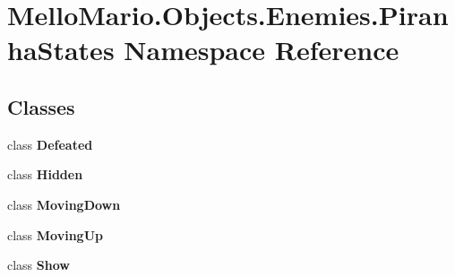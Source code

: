 \section{Mello\+Mario.\+Objects.\+Enemies.\+Piranha\+States Namespace Reference}
\label{namespaceMelloMario_1_1Objects_1_1Enemies_1_1PiranhaStates}
\subsection*{Classes}
\begin{DoxyCompactItemize}
\item 
class \textbf{ Defeated}
\item 
class \textbf{ Hidden}
\item 
class \textbf{ Moving\+Down}
\item 
class \textbf{ Moving\+Up}
\item 
class \textbf{ Show}
\end{DoxyCompactItemize}
